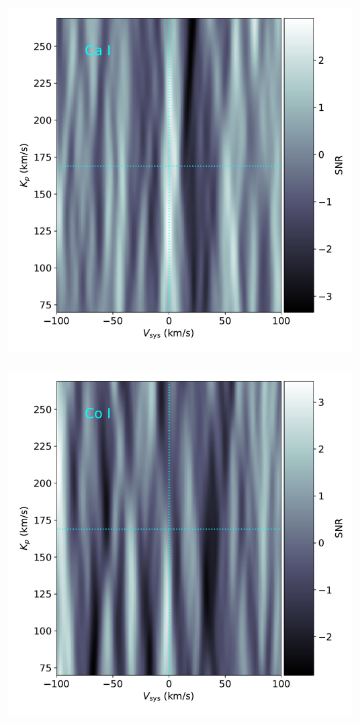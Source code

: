 \documentclass[twocolumn]{aastex631}
\begin{document}
\begin{figure}[ht!]
\begin{subfigure}[b]{0.3\textwidth}
            \end{subfigure}
            \begin{subfigure}[b]{0.3\textwidth}
                \centering
                \includegraphics[width=\textwidth]{plots-updated/kp-vsys-map/combined/KELT-20b.20190504.combined.Ca.CCFs-shifted.pdf}
            \end{subfigure}
            \begin{subfigure}[b]{0.3\textwidth}
                \centering
                \includegraphics[width=\textwidth]{plots-updated/kp-vsys-map/combined/KELT-20b.20190504.combined.Co.CCFs-shifted.pdf}

\end{subfigure}
\end{figure}
\end{document}
